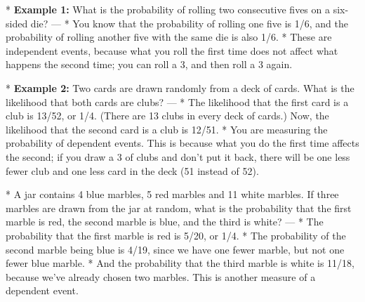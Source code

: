 * \textbf{Example 1:} What is the probability of rolling two consecutive fives on a six-sided die?
--- 
* You know that the probability of rolling one five is 1/6, and the probability of rolling another five with the same die is also 1/6.
* These are independent events, because what you roll the first time does not affect what happens the second time; you can roll a 3, and then roll a 3 again.


* \textbf{Example 2:} Two cards are drawn randomly from a deck of cards. What is the likelihood that both cards are clubs?
--- 
* The likelihood that the first card is a club is 13/52, or 1/4. (There are 13 clubs in every deck of cards.) Now, the likelihood that the second card is a club is 12/51.
* You are measuring the probability of dependent events. This is because what you do the first time affects the second; if you draw a 3 of clubs and don't put it back, there will be one less fewer club and one less card in the deck (51 instead of 52).

* A jar contains 4 blue marbles, 5 red marbles and 11 white marbles. If three marbles are drawn from the jar at random, what is the probability that the first marble is red, the second marble is blue, and the third is white?
--- 
* The probability that the first marble is red is 5/20, or 1/4. 
* The probability of the second marble being blue is 4/19, since we have one fewer marble, but not one fewer blue marble. 
* And the probability that the third marble is white is 11/18, because we've already chosen two marbles. This is another measure of a dependent event.


